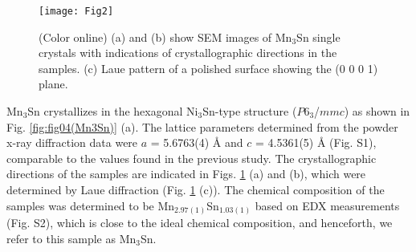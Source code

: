 \documentclass[prb,twocolumn,showpacs,preprintnumbers,amsmath,amssymb]{revtex4}
\begin{document}



\begin{figure}

\centering
\texttt{[image: Fig2]}

\caption{
(Color online)
(a) and (b) show SEM images of Mn$_3$Sn single crystals with indications of crystallographic directions in the samples.
(c) Laue pattern of a polished surface showing the (0 0 0 1) plane.
}\label{fig:fig00(Mn3Sn)}

\end{figure}


Mn$_3$Sn crystallizes in the hexagonal Ni$_3$Sn-type structure ($P$6$_3$/${mmc}$) as shown in Fig.  \ref{fig:fig04(Mn3Sn)} (a). 
The lattice parameters determined from the powder x-ray diffraction data were $a$ = 5.6763(4) {\AA} and $c$ = 4.5361(5) {\AA} (Fig. S1), comparable to the values found in the previous study.\cite{XRD}
The crystallographic directions of the samples are indicated in Figs. \ref{fig:fig00(Mn3Sn)} (a) and (b), which were determined by Laue diffraction (Fig. \ref{fig:fig00(Mn3Sn)} (c)).  
The chemical composition of the samples was determined to be Mn$_{2.97(1)}$Sn$_{1.03(1)}$ based on EDX measurements (Fig. S2), which is close to the ideal chemical composition, and henceforth, we refer to this sample as Mn$_3$Sn.
\end{document}
